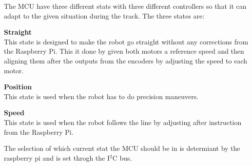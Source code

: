 The MCU have three different stats with three different controllers so that it can adapt to the given situation during the track. The three states are:



\begin{itemize}
	\begin{item}
		\textbf{Straight}\\ This state is designed to make the robot go straight without any corrections from the Raspberry Pi. This it done by given both motors a reference speed and then aligning them after the outputs from the encoders by adjusting the speed to each motor. 
	\end{item}
	
	\begin{item}
		\textbf{Position}\\This state is used when the robot has to do precision maneuvers. 
	\end{item}
	
	\begin{item}
		\textbf{Speed}\\This state is used when the robot follows the line by adjusting after instruction from the Raspberry Pi.
	\end{item}

\end{itemize}

The selection of which current stat the MCU should be in is determiant by the raspberry pi and is set throgh the I$^2$C bus.


